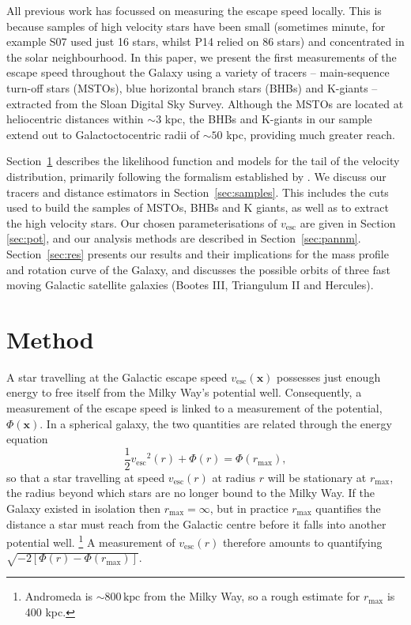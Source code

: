 \documentclass[useAMS,twocolumn,usenatbib]{mn2e}
\def\kpc{{\,\mathrm{kpc}}}
\def\vesc{{v_\mathrm{esc}}}
\def\pos{{\boldsymbol{x}}}
\begin{document}
All previous work has focussed on measuring the escape speed locally. 
This is because samples of high velocity stars have been small (sometimes minute, for example S07 used just 16 stars, whilst P14 relied on 86 stars) and concentrated in the solar neighbourhood.
In this paper, we present the first measurements of the escape speed throughout the Galaxy using a variety of tracers -- main-sequence turn-off stars (MSTOs), blue horizontal branch stars (BHBs) and K-giants -- extracted from the Sloan Digital Sky Survey.
Although the MSTOs are located at heliocentric distances within $\sim 3$ kpc, the BHBs and K-giants in our sample extend out to Galactoctocentric radii of $\sim 50$ kpc, providing much greater reach.

Section~\ref{sec:method} describes the likelihood function and models for the tail of the velocity distribution, primarily following the formalism established by \citet{Le90}. 
We discuss our tracers and distance estimators in Section~\ref{sec:samples}. 
This includes the cuts used to build the samples of MSTOs, BHBs and K giants, as well as to extract the high velocity stars. 
Our chosen parameterisations of $\vesc$ are given in Section \ref{sec:pot}, and our analysis methods are described in Section~\ref{sec:pannm}.
Section~\ref{sec:res} presents our results and their implications for the mass profile and rotation curve of the Galaxy, and discusses the possible orbits of three fast moving Galactic satellite galaxies (Bootes III, Triangulum II and Hercules).

\section{Method}

\label{sec:method}

A star travelling at the Galactic escape speed $\vesc(\pos)$ possesses just enough energy to free itself from the Milky Way's potential well.
Consequently, a measurement of the escape speed is linked to a measurement of the potential, $\Phi(\pos)$.
In a spherical galaxy, the two quantities are related through the energy equation
%
\begin{equation}
\frac{1}{2}\vesc^2(r) + \Phi(r) = \Phi(r_\text{max}),
\label{eq:vesc_def}
\end{equation}
%
so that a star travelling at speed $\vesc(r)$ at radius $r$ will be stationary at $r_\text{max}$, the radius beyond which stars are no longer bound to the Milky Way.
If the Galaxy existed in isolation then $r_\text{max}=\infty$, but in practice $r_\text{max}$ quantifies the distance a star must reach from the Galactic centre before it falls into another potential well.
\footnote{Andromeda is $\sim 800\kpc$ from the Milky Way, so a rough estimate for $r_\text{max}$ is 400 kpc.}
A measurement of $\vesc(r)$ therefore amounts to quantifying $\sqrt{-2\left[\Phi(r) - \Phi(r_\text{max})\right]}$.
\end{document}
